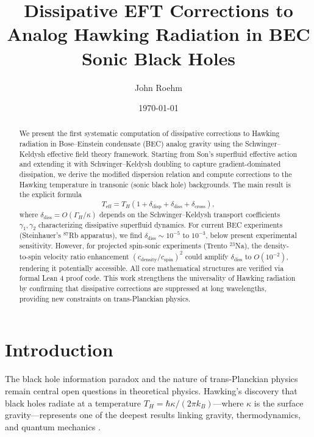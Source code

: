 \documentclass[aps,prl,twocolumn,superscriptaddress,nofootinbib,amsmath,amssymb]{revtex4-2}
\begin{document}
\title{Dissipative EFT Corrections to Analog Hawking Radiation in BEC Sonic Black Holes}

\author{John Roehm}

\date{\today}

\begin{abstract}
We present the first systematic computation of dissipative corrections to Hawking radiation in Bose--Einstein condensate (BEC) analog gravity using the Schwinger--Keldysh effective field theory framework. Starting from Son's superfluid effective action and extending it with Schwinger--Keldysh doubling to capture gradient-dominated dissipation, we derive the modified dispersion relation and compute corrections to the Hawking temperature in transonic (sonic black hole) backgrounds. The main result is the explicit formula
\begin{equation*}
T_{\text{eff}} = T_H \left(1 + \delta_{\text{disp}} + \delta_{\text{diss}} + \delta_{\text{cross}}\right),
\end{equation*}
where $\delta_{\text{diss}} = O(\Gamma_H / \kappa)$ depends on the Schwinger--Keldysh transport coefficients $\gamma_1, \gamma_2$ characterizing dissipative superfluid dynamics. For current BEC experiments (Steinhauer's $^{87}$Rb apparatus), we find $\delta_{\text{diss}} \sim 10^{-5}$ to $10^{-3}$, below present experimental sensitivity. However, for projected spin-sonic experiments (Trento $^{23}$Na), the density-to-spin velocity ratio enhancement $(c_{\text{density}}/c_{\text{spin}})^2$ could amplify $\delta_{\text{diss}}$ to $O(10^{-2})$, rendering it potentially accessible. All core mathematical structures are verified via formal Lean 4 proof code. This work strengthens the universality of Hawking radiation by confirming that dissipative corrections are suppressed at long wavelengths, providing new constraints on trans-Planckian physics.
\end{abstract}

\maketitle

\section{Introduction}
\label{sec:intro}

The black hole information paradox and the nature of trans-Planckian physics remain central open questions in theoretical physics. Hawking's discovery that black holes radiate at a temperature $T_H = \hbar \kappa / (2\pi k_B)$---where $\kappa$ is the surface gravity---represents one of the deepest results linking gravity, thermodynamics, and quantum mechanics \cite{Hawking:1974}.
\end{document}

